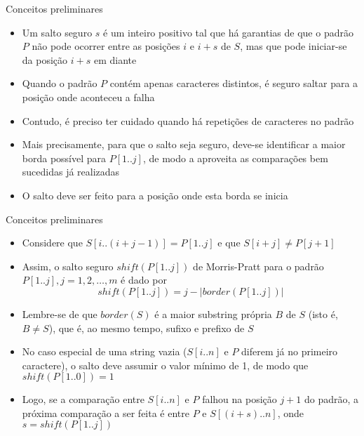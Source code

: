 \begin{frame}[fragile]{Conceitos preliminares}

    \begin{itemize}
        \item Um salto seguro $s$ é um inteiro positivo tal que há garantias de que o padrão $P$
            não pode ocorrer entre as posições $i$ e $i + s$ de $S$, mas que pode iniciar-se 
            da posição $i+s$ em diante

        \item Quando o padrão $P$ contém apenas caracteres distintos, é seguro saltar para a 
            posição onde aconteceu a falha

        \item Contudo, é preciso ter cuidado quando há repetições de caracteres no padrão

        \item Mais precisamente, para que o salto seja seguro, deve-se identificar a maior borda 
            possível para $P[1..j]$, de modo a aproveita as comparações bem sucedidas já
            realizadas

        \item O salto deve ser feito para a posição onde esta borda se inicia

    \end{itemize}

\end{frame}

\begin{frame}[fragile]{Conceitos preliminares}

    \begin{itemize}
        \item Considere que $S[i..(i + j - 1)] = P[1..j]$ e que $S[i + j] \neq P[j + 1]$

        \item Assim, o salto seguro $shift(P[1..j])$ de Morris-Pratt para o padrão 
        $P[1..j], j = 1, 2, \ldots, m$ é dado por
        \[
            shift(P[1..j]) = j - |border(P[1..j])|
        \]

        \item Lembre-se de que $border(S)$ é a maior substring própria $B$ de $S$ (isto é,
            $B\neq S$), que é, ao mesmo tempo, sufixo e prefixo de $S$

        \item No caso especial de uma string vazia ($S[i..n]$ e $P$ diferem já no primeiro
            caractere), o salto deve assumir o valor mínimo de 1, de 
            modo que $shift(P[1..0]) = 1$

        \item Logo, se a comparação entre $S[i..n]$ e $P$ falhou na posição $j + 1$ do padrão,
            a próxima comparação a ser feita é entre $P$ e $S[(i + s)..n]$, onde
            $s = shift(P[1..j])$
    \end{itemize}

\end{frame}


